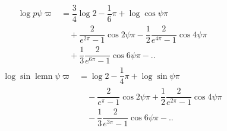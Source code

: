 \[
\begin{aligned}
\log p\psi\varpi&=\dfrac34\log2-\dfrac16\pi+\log\cos\psi\pi\\[5pt]
&\quad+\dfrac{2}{e^{2\pi}-1}\cos2\psi\pi
-\dfrac12\dfrac{2}{e^{4\pi}-1}\cos4\psi\pi
\\[7pt]&\quad{}+\dfrac13\dfrac{2}{e^{6\pi}-1}\cos6\psi\pi-\mathord{.}\mathord{.}
\end{aligned}
\]
\[
\begin{aligned}
\log\sin\operatorname{lemn}\psi\varpi&=\log2-\dfrac14\pi+\log\sin\psi\pi\\[5pt]
&\quad-\dfrac{2}{e^{\pi}-1}\cos2\psi\pi
+\dfrac12\dfrac{2}{e^{2\pi}-1}\cos4\psi\pi
\\[7pt]&\quad{}-\dfrac13\dfrac{2}{e^{3\pi}-1}\cos6\psi\pi-\mathord{.}\mathord{.}
\end{aligned}
\]



